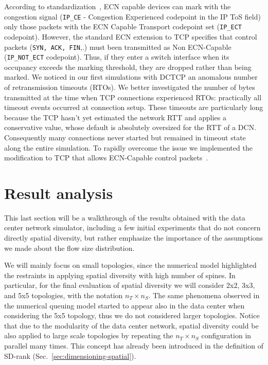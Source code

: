 According to standardization~\cite{ipecn}, ECN capable devices can mark with the congestion signal (\texttt{IP\_CE} - Congestion Experienced codepoint in the IP ToS field) only those packets with the  ECN Capable Transport codepoint set (\texttt{IP\_ECT} codepoint). However, the standard ECN extension to TCP specifies that control packets (\texttt{SYN, ACK, FIN},.) must been transmitted as Non ECN-Capable (\texttt{IP\_NOT\_ECT} codepoint). Thus, if they enter a switch interface when its occupancy exceeds the marking threshold, they are dropped rather than being marked. We noticed in our first simulations with DCTCP an anomalous number of retransmission timeouts (RTOs). We better investigated the number of bytes transmitted at the time when TCP connections experienced RTOs: practically all timeout events occurred at connection setup. These timeouts are particularly long because the TCP hasn't yet estimated the network RTT and applies a conservative value, whose default is absolutely oversized for the RTT of a DCN. Consequently many connections never started but remained in timeout state along the entire simulation. To rapidly overcome the issue we implemented the modification to TCP that allows ECN-Capable control packets~\cite{synecn}.
\section{Result analysis}
This last section will be a walkthrough of the results obtained with the data center network simulator, including a few initial experiments that do not concern directly spatial diversity, but rather emphasize the importance of the assumptions we made about the flow size distribution.

We will mainly focus on small topologies, since the numerical model highlighted the restraints in applying spatial diversity with high number of spines. In particular, for the final evaluation of spatial diversity we will consider 2x2, 3x3, and 5x5 topologies, with the notation $n_T \times n_S$. The same phenomena observed in the numerical queuing model started to appear also in the data center when considering the 5x5 topology, thus we do not considered larger topologies. Notice that due to the modularity of the data center network, spatial diversity could be also applied to large scale topologies by repeating the $n_T \times n_S$ configuration in parallel many times. This concept has already been introduced in the definition of SD-rank (Sec.~\ref{sec:dimensioning-spatial}). 
